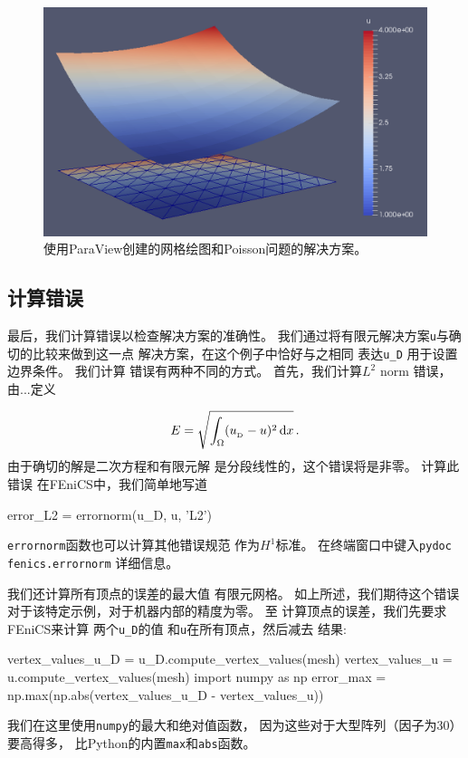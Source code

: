 \begin{figure}[!ht]  %
 \centerline{\includegraphics[width=0.95\linewidth]{fig/poisson_paraview.png}}
 \caption{
 使用ParaView创建的网格绘图和Poisson问题的解决方案。\label{fig:poisson_paraview}
 }
\end{figure}

\subsection{计算错误}


最后，我们计算错误以检查解决方案的准确性。
我们通过将有限元解决方案\texttt{u}与确切的比较来做到这一点
解决方案，在这个例子中恰好与之相同
表达\verb!u_D! 用于设置边界条件。 我们计算
错误有两种不同的方式。 首先，我们计算$L^2$ norm
错误，由...定义

\[ E = \sqrt{\int_\Omega (\ub - u)^2\dx}\tp\]
由于确切的解是二次方程和有限元解
是分段线性的，这个错误将是非零。 计算此错误
在FEniCS中，我们简单地写道

\begin{python}
error_L2 = errornorm(u_D, u, 'L2')
\end{python}
\texttt{errornorm}函数也可以计算其他错误规范
作为$H^1$标准。 在终端窗口中键入\texttt{pydoc fenics.errornorm}
详细信息。

我们还计算所有顶点的误差的最大值
有限元网格。 如上所述，我们期待这个错误
对于该特定示例，对于机器内部的精度为零。 至
计算顶点的误差，我们先要求FEniCS来计算
两个\verb!u_D!的值 和\texttt{u}在所有顶点，然后减去
结果:

\begin{python}
vertex_values_u_D = u_D.compute_vertex_values(mesh)
vertex_values_u = u.compute_vertex_values(mesh)
import numpy as np
error_max = np.max(np.abs(vertex_values_u_D - vertex_values_u))
\end{python}
我们在这里使用\texttt{numpy}的最大和绝对值函数，
因为这些对于大型阵列（因子为30）要高得多，
比Python的内置\texttt{max}和\texttt{abs}函数。


